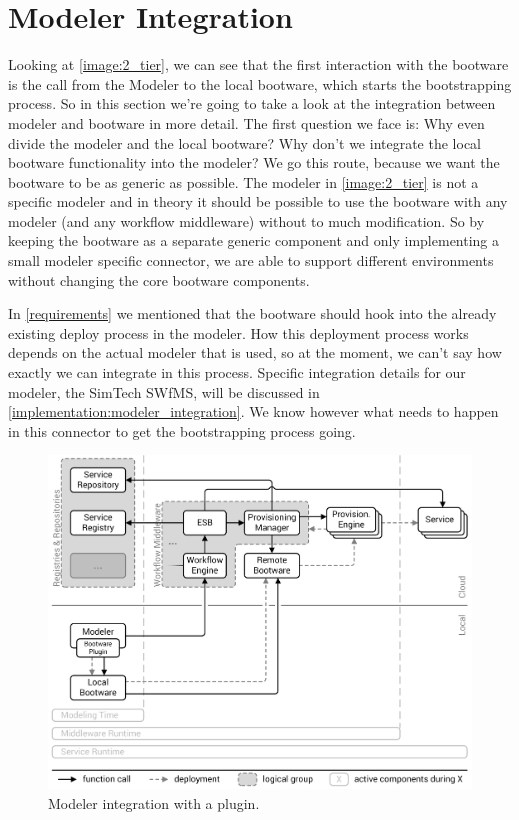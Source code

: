 \section{Modeler Integration}
\label{design:modeler_integration}

Looking at \autoref{image:2_tier}, we can see that the first interaction with the bootware is the call from the Modeler to the local bootware, which starts the bootstrapping process.
So in this section we're going to take a look at the integration between modeler and bootware in more detail.
The first question we face is: Why even divide the modeler and the local bootware?
Why don't we integrate the local bootware functionality into the modeler?
We go this route, because we want the bootware to be as generic as possible.
The modeler in \autoref{image:2_tier} is not a specific modeler and in theory it should be possible to use the bootware with any modeler (and any workflow middleware) without to much modification.
So by keeping the bootware as a separate generic component and only implementing a small modeler specific connector, we are able to support different environments without changing the core bootware components.

In \autoref{requirements} we mentioned that the bootware should hook into the already existing deploy process in the modeler.
How this deployment process works depends on the actual modeler that is used, so at the moment, we can't say how exactly we can integrate in this process.
Specific integration details for our modeler, the SimTech SWfMS, will be discussed in \autoref{implementation:modeler_integration}.
We know however what needs to happen in this connector to get the bootstrapping process going.

\begin{figure}[!htbp]
	\centering
	\includegraphics[resolution=600]{design/assets/modeler_plugin}
	\caption{Modeler integration with a plugin.}
	\label{image:modeler_plugin}
\end{figure}

